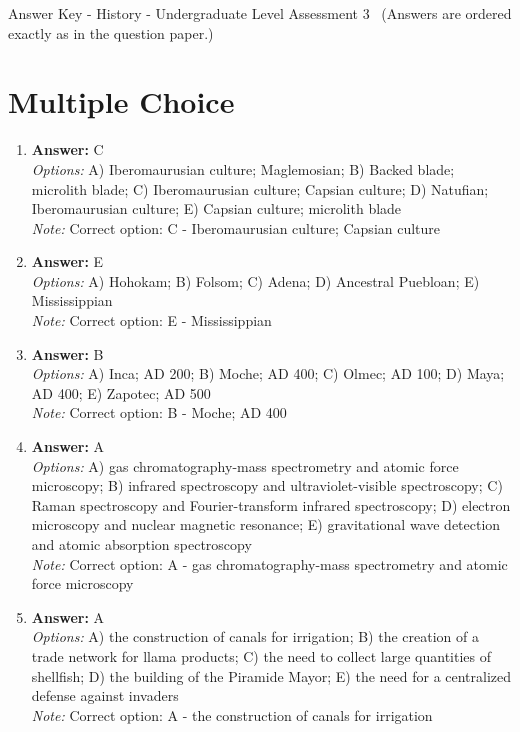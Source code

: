 \documentclass[12pt]{article}
\begin{document}
\begin{center}
Answer Key - History - Undergraduate Level Assessment 3 \
\small (Answers are ordered exactly as in the question paper.)
\end{center}

\section*{Multiple Choice}
\begin{enumerate}[label=\arabic*.]
\item \textbf{Answer:} C
\\ \textit{Options:} A) Iberomaurusian culture; Maglemosian; B) Backed blade; microlith blade; C) Iberomaurusian culture; Capsian culture; D) Natufian; Iberomaurusian culture; E) Capsian culture; microlith blade
\\ \textit{Note:} Correct option: C - Iberomaurusian culture; Capsian culture
\item \textbf{Answer:} E
\\ \textit{Options:} A) Hohokam; B) Folsom; C) Adena; D) Ancestral Puebloan; E) Mississippian
\\ \textit{Note:} Correct option: E - Mississippian
\item \textbf{Answer:} B
\\ \textit{Options:} A) Inca; AD 200; B) Moche; AD 400; C) Olmec; AD 100; D) Maya; AD 400; E) Zapotec; AD 500
\\ \textit{Note:} Correct option: B - Moche; AD 400
\item \textbf{Answer:} A
\\ \textit{Options:} A) gas chromatography-mass spectrometry and atomic force microscopy; B) infrared spectroscopy and ultraviolet-visible spectroscopy; C) Raman spectroscopy and Fourier-transform infrared spectroscopy; D) electron microscopy and nuclear magnetic resonance; E) gravitational wave detection and atomic absorption spectroscopy
\\ \textit{Note:} Correct option: A - gas chromatography-mass spectrometry and atomic force microscopy
\item \textbf{Answer:} A
\\ \textit{Options:} A) the construction of canals for irrigation; B) the creation of a trade network for llama products; C) the need to collect large quantities of shellfish; D) the building of the Piramide Mayor; E) the need for a centralized defense against invaders
\\ \textit{Note:} Correct option: A - the construction of canals for irrigation
\end{enumerate}
\end{document}
